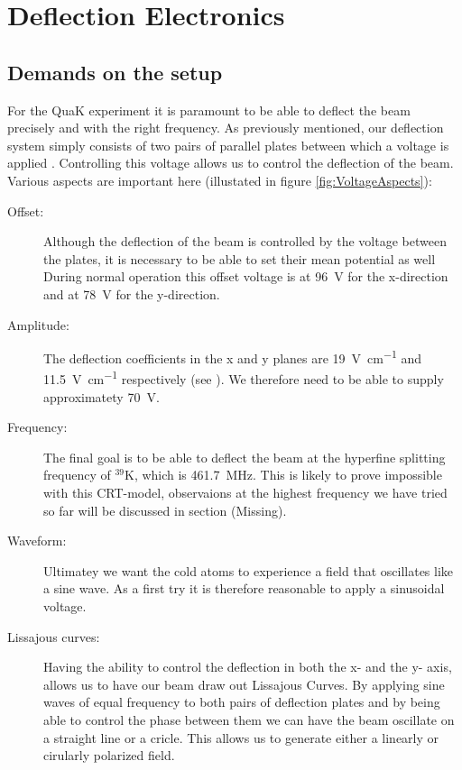 
\chapter{Deflection Electronics}

\section{Demands on the setup}
For the QuaK experiment it is paramount to be able to deflect the beam precisely and with the right frequency. 
As previously mentioned, our deflection system simply consists of two pairs of parallel plates between which a voltage is applied . Controlling this voltage allows us to control the deflection of the beam. Various aspects are important here (illustated in figure \ref{fig:VoltageAspects}):

\begin{description}
	\item[Offset:] Although the deflection of the beam is controlled by the voltage between the plates, it is necessary to be able to set their mean potential as well During normal operation this offset voltage is at \SI{96}{\volt} for the x-direction and at \SI{78}{\volt} for the y-direction.
	\item[Amplitude:] The deflection coefficients in the x and y planes are \SI{19}{\volt\per\centi\meter} and \SI{11.5}{\volt\per\centi\meter} respectively (see \cite{D14363GY123-manual}). We therefore need to be able to supply approximatety \SI{70}{\volt}.
	
	\item[Frequency:] The final goal is to be able to deflect the beam at the hyperfine splitting frequency of $^{39}\mathrm{K}$, which is \SI{461.7}{\mega\hertz}. This is likely to prove impossible with this CRT-model, observaions at the highest frequency we have tried so far will be discussed in section (Missing).
	
	\item[Waveform:] Ultimatey we want the cold atoms to experience a field that oscillates like a sine wave. As a first try it is therefore reasonable to apply a sinusoidal voltage.
	\item[Lissajous curves:] Having the ability to control the deflection in both the x- and the y- axis, allows us to have our beam draw out Lissajous Curves. By applying sine waves of equal frequency to both pairs of deflection plates and by being able to control the phase between them we can have the beam oscillate on a straight line or a cricle. This allows us to generate either a linearly or cirularly polarized field.
\end{description}



